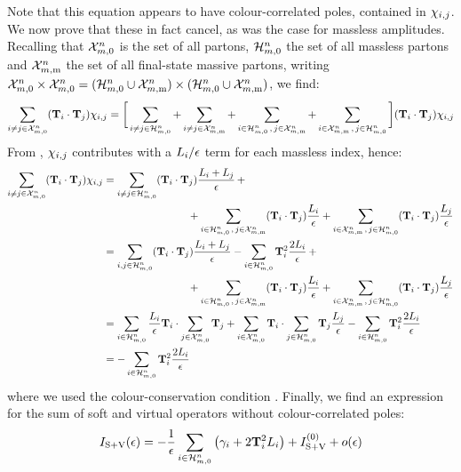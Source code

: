 Note that this equation appears to have colour-correlated poles, contained in $ \chi_{i,j} $. We now prove that these in fact cancel, as was the case for massless amplitudes. Recalling that $ \mathcal{X}^{n}_{m,0} $ is the set of all partons, $ \mathcal{H}^{n}_{m,0} $ the set of all massless partons and $ \mathcal{X}^{n}_{m,\text{m}} $ the set of all final-state massive partons, writing $ \mathcal{X}^{n}_{m,0} \times \mathcal{X}^{n}_{m,0} = (\mathcal{H}^{n}_{m,0} \cup \mathcal{X}^{n}_{m,\text{m}}) \times (\mathcal{H}^{n}_{m,0} \cup \mathcal{X}^{n}_{m,\text{m}}) $, we find:
\begin{equation*}
  \sum_{i \neq j \in \mathcal{X}^{n}_{m,0}} (\mathbf{T}_i \cdot \mathbf{T}_j) \chi_{i,j} = \bigg[ \sum_{i \neq j \in \mathcal{H}^{n}_{m,0}} + \sum_{i \neq j \in \mathcal{X}^{n}_{m,\text{m}}} + \sum_{i \in \mathcal{H}^{n}_{m,0} \,,\, j \in \mathcal{X}^{n}_{m,\text{m}}} + \sum_{i \in \mathcal{X}^{n}_{m,\text{m}} \,,\, j \in \mathcal{H}^{n}_{m,0}} \bigg] (\mathbf{T}_i \cdot \mathbf{T}_j) \chi_{i,j}
\end{equation*}
From , $ \chi_{i,j} $ contributes with a $ L_i / \epsilon $ term for each massless index, hence:
\begin{equation*}
  \begin{split}
    \sum_{i \neq j \in \mathcal{X}^{n}_{m,0}} (\mathbf{T}_i \cdot \mathbf{T}_j) \chi_{i,j}
    & = \sum_{i \neq j \in \mathcal{H}^{n}_{m,0}} (\mathbf{T}_i \cdot \mathbf{T}_j) \frac{L_i + L_j}{\epsilon} \,+ \\
    & \qquad \qquad \qquad \qquad + \sum_{i \in \mathcal{H}^{n}_{m,0} \,,\, j \in \mathcal{X}^{n}_{m,\text{m}}} (\mathbf{T}_i \cdot \mathbf{T}_j) \frac{L_i}{\epsilon} + \sum_{i \in \mathcal{X}^{n}_{m,\text{m}} \,,\, j \in \mathcal{H}^{n}_{m,0}} (\mathbf{T}_i \cdot \mathbf{T}_j) \frac{L_j}{\epsilon} \\
    & = \sum_{i , j \in \mathcal{H}^{n}_{m,0}} (\mathbf{T}_i \cdot \mathbf{T}_j)\frac{L_i + L_j}{\epsilon} - \sum_{i \in \mathcal{H}^{n}_{m,0}} \mathbf{T}_i^2 \frac{2L_i}{\epsilon} \,+ \\
    & \qquad \qquad \qquad \qquad + \sum_{i \in \mathcal{H}^{n}_{m,0} \,,\, j \in \mathcal{X}^{n}_{m,\text{m}}} (\mathbf{T}_i \cdot \mathbf{T}_j) \frac{L_i}{\epsilon} + \sum_{i \in \mathcal{X}^{n}_{m,\text{m}} \,,\, j \in \mathcal{H}^{n}_{m,0}} (\mathbf{T}_i \cdot \mathbf{T}_j) \frac{L_j}{\epsilon} \\
    & = \sum_{i \in \mathcal{H}^{n}_{m,0}} \frac{L_i}{\epsilon} \mathbf{T}_i \cdot \sum_{j \in \mathcal{X}^{n}_{m,0}} \mathbf{T}_j + \sum_{i \in \mathcal{X}^{n}_{m,0}} \mathbf{T}_i \cdot \sum_{j \in \mathcal{H}^{n}_{m,0}} \mathbf{T}_j \frac{L_j}{\epsilon} - \sum_{i \in \mathcal{H}^{n}_{m,0}} \mathbf{T}_i^2 \frac{2L_i}{\epsilon} \\
    & = - \sum_{i \in \mathcal{H}^{n}_{m,0}} \mathbf{T}_i^2 \frac{2L_i}{\epsilon}
  \end{split}
\end{equation*}
where we used the colour-conservation condition . Finally, we find an expression for the sum of soft and virtual operators without colour-correlated poles:
\begin{equation}
  I_{\text{S}+\text{V}}(\epsilon) = - \frac{1}{\epsilon} \sum_{i \in \mathcal{H}^{n}_{m,0}} \left( \gamma_i + 2 \mathbf{T}_i^2 L_i \right) + I_{\text{S}+\text{V}}^{(0)} + o(\epsilon)
  \label{eq:isvo}
\end{equation}
